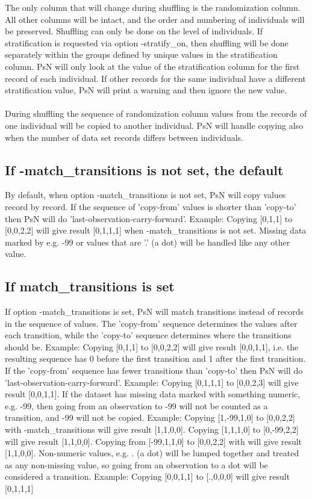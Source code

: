 \documentclass[a4paper,12pt]{article}
\begin{document}
The only column that will change during shuffling is the randomization column. All other columns will be intact, and the order and numbering of individuals will be preserved. Shuffling can only be done on the level of individuals. If stratification is requested via option -stratify\_on, then shuffling will be done separately within the groups defined by unique values in the stratification column. PsN will only look at the value of the stratification column for the first record of each individual. If other records for the same individual have a different stratification value, PsN will print a warning and then ignore the new value.
\\
\\
During shuffling the sequence of randomization column values from the records of one individual will be copied to another individual. PsN will handle copying also when the number of data set records differs between individuals.

\subsection{If -match\_transitions is not set, the default}

By default, when option -match\_transitions is not set, PsN will copy values record by record. If the sequence of 'copy-from' values is shorter than 'copy-to' then PsN will do 'last-observation-carry-forward'. Example: Copying [0,1,1] to [0,0,2,2] will give result [0,1,1,1] when -match\_transitions is not set. Missing data marked by e.g. -99 or values that are '.' (a dot) will be handled like any other value. 

\subsection{If match\_transitions is set}

If option -match\_transitions is set, PsN will match transitions instead of records in the sequence of values. The 'copy-from' sequence determines the values after each transition, while the 'copy-to' sequence determines where the transitions should be. Example: Copying [0,1,1] to [0,0,2,2] will give result [0,0,1,1], i.e. the resulting sequence has 0 before the first transition and 1 after the first transition. If the 'copy-from' sequence has fewer transitions than 'copy-to' then PsN will do 'last-observation-carry-forward'. Example: Copying [0,1,1,1] to [0,0,2,3] will give result [0,0,1,1]. If the dataset has missing data marked with something numeric, e.g. -99, then going from an observation to -99 will not be counted as a transition, and -99 will not be copied. Example: Copying [1,-99,1,0] to [0,0,2,2] with -match\_transitions will give result [1,1,0,0]. Copying [1,1,1,0] to [0,-99,2,2] will give result [1,1,0,0]. Copying from [-99,1,1,0] to [0,0,2,2] with will give result [1,1,0,0]. Non-numeric values, e.g. . (a dot) will be lumped together and treated as any non-missing value, so going from an observation to a dot will be considered a transition. Example: Copying [0,0,1,1] to  [.,0,0,0] will give result [0,1,1,1] 
\end{document}
